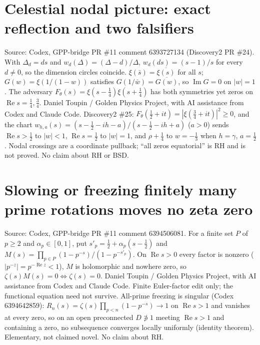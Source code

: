 \documentclass{report}
\theoremstyle{definition}
\begin{document}
\begin{itemize}
\begin{itemize}
\section{Celestial nodal picture: exact reflection and two falsifiers}
Source: Codex, GPP-bridge PR \#11 comment 6393727134 (Discovery2 PR \#24). With $\Delta_d=ds$ and $w_d(\Delta)=(\Delta-d)/\Delta$, $w_d(ds)=(s-1)/s$ for every $d\ne0$, so the
dimension circles coincide. $\xi(\bar s)=\overline{\xi(s)}$ for all $s$; $G(w)=\xi(1/(1-w))$ satisfies $G(1/\bar w)=\overline{G(w)}$, so $\operatorname{Im}G=0$ on $|w|=1$.
The adversary $F_\theta(s)=\xi(s-\tfrac14)\xi(s+\tfrac14)$ has both symmetries yet zeros on $\operatorname{Re}s=\tfrac14,\tfrac34$. Daniel Toupin / Golden Physics Project, with
AI assistance from Codex and Claude Code. Discovery2 \#25: $F_\theta(\tfrac12+it)=|\xi(\tfrac34+it)|^2\ge0$, and the chart $w_{h,a}(s)=(s-\tfrac12-ih-a)/(s-\tfrac12-ih+a)$ ($a>0$) sends $\operatorname{Re}s>\tfrac12$ to $|w|<1$, $\operatorname{Re}s=\tfrac12$ to $|w|=1$, and $\rho+\tfrac14$ to $w=-\tfrac13$ when $h=\gamma$, $a=\tfrac12$. Nodal crossings are a coordinate pullback; ``all zeros equatorial'' is RH and is not proved. No claim about RH or BSD.

\section{Slowing or freezing finitely many prime rotations moves no zeta zero}
Source: Codex, GPP-bridge PR \#11 comment 6394506081. For a finite set $P$ of $p\ge2$ and $\alpha_p\in[0,1]$, put $s'_p=\tfrac12+\alpha_p(s-\tfrac12)$ and
$M(s)=\prod_{p\in P}(1-p^{-s})/(1-p^{-s'_p})$. On $\operatorname{Re}s>0$ every factor is nonzero ($|p^{-z}|=p^{-\operatorname{Re}z}<1$), $M$ is holomorphic and nowhere zero, so
$\zeta(s)M(s)=0\iff\zeta(s)=0$. Daniel Toupin / Golden Physics Project, with AI assistance from Codex and Claude Code. Finite Euler-factor edit only; the functional equation
need not survive. All-prime freezing is singular (Codex 6394642859): $R_n(s)=\zeta(s)\prod_{p<n}(1-p^{-s})\to1$ on $\operatorname{Re}s>1$ and vanishes at every zero, so on an open preconnected $D\not\ni1$ meeting $\operatorname{Re}s>1$ and containing a zero, no subsequence converges locally uniformly (identity theorem). Elementary, not claimed novel. No claim about RH.


\end{itemize}
\end{itemize}
\end{document}
